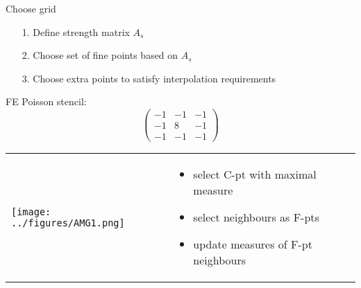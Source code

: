 \documentclass{beamer}
\begin{document}
\begin{frame}



Choose grid
\begin{itemize}
  \item[1.] Define strength matrix $A_s$
  \item[2.] Choose set of fine points based on $A_s$
  \item[3.] Choose extra points to satisfy interpolation requirements
\end{itemize}

\vspace{.5in}

FE Poisson stencil:
\begin{equation} \nonumber
 \begin{pmatrix}
     -1 &-1&-1\\
     -1 &8&-1\\
     -1 &-1&-1
   \end{pmatrix}
\end{equation}
\end{frame}

\begin{frame}

\begin{tabular}{ p{} p{}}

\hspace{5mm} \texttt{[image: ../figures/AMG1.png]} &

\vspace{-1.75in}

\begin{itemize}
  \item select C-pt with maximal measure
  \item select neighbours as F-pts
  \item update measures of F-pt neighbours

\end{itemize}

\end{tabular}

\end{frame}
\end{document}
